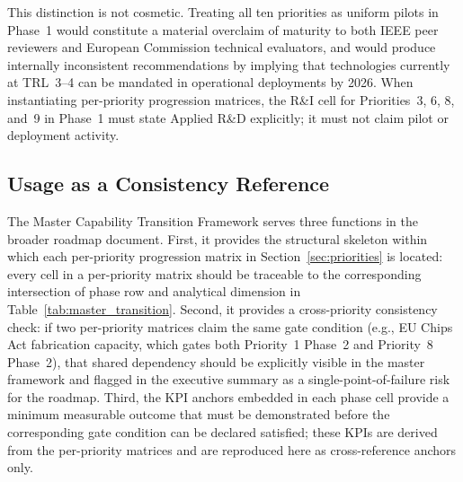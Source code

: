 This distinction is not cosmetic. Treating all ten priorities as uniform
pilots in Phase~1 would constitute a material overclaim of maturity to
both IEEE peer reviewers and European Commission technical evaluators, and
would produce internally inconsistent recommendations by implying that
technologies currently at TRL~3--4 can be mandated in operational
deployments by 2026. When instantiating per-priority progression matrices,
the R\&I cell for Priorities~3, 6, 8, and~9 in Phase~1 must state Applied
R\&D explicitly; it must not claim pilot or deployment activity.

\subsection*{Usage as a Consistency Reference}

The Master Capability Transition Framework serves three functions in the
broader roadmap document. First, it provides the structural skeleton within
which each per-priority progression matrix in Section~\ref{sec:priorities}
is located: every cell in a per-priority matrix should be traceable to the
corresponding intersection of phase row and analytical dimension in
Table~\ref{tab:master_transition}. Second, it provides a cross-priority
consistency check: if two per-priority matrices claim the same gate
condition (e.g., EU Chips Act fabrication capacity, which gates both
Priority~1 Phase~2 and Priority~8 Phase~2), that shared dependency should
be explicitly visible in the master framework and flagged in the executive
summary as a single-point-of-failure risk for the roadmap. Third, the
KPI anchors embedded in each phase cell provide a minimum measurable
outcome that must be demonstrated before the corresponding gate condition
can be declared satisfied; these KPIs are derived from the per-priority
matrices and are reproduced here as cross-reference anchors only.